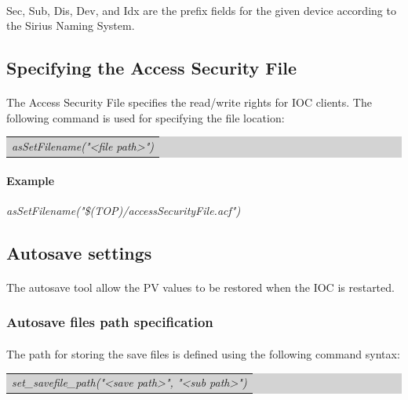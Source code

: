 \documentclass[openany]{article}
\begin{document}
			\paragraph{} Sec, Sub, Dis, Dev, and Idx are the prefix fields for the given device according to the Sirius Naming System.

	\subsection{Specifying the Access Security File}

		\paragraph{} The Access Security File specifies the read/write rights for IOC clients. The following command is used for specifying the file location:

		\bigskip
		\colorbox{lightgray}{
			\begin{tabularx}{0.9\textwidth}{X}
			\emph{asSetFilename("\textless file path\textgreater")}
			\end{tabularx}
		}

		\paragraph{Example} \emph{asSetFilename("\$(TOP)/accessSecurityFile.acf")}

	\subsection{Autosave settings}

		\paragraph{} The autosave tool allow the PV values to be restored when the IOC is restarted.

		\subsubsection{Autosave files path specification}

			\paragraph{} The path for storing the save files is defined using the following command syntax:

			\bigskip
			\colorbox{lightgray}{
				\begin{tabularx}{0.9\textwidth}{X}
				\emph{set\_savefile\_path("\textless save path\textgreater", "\textless sub path\textgreater")}
				\end{tabularx}
			}
\end{document}
